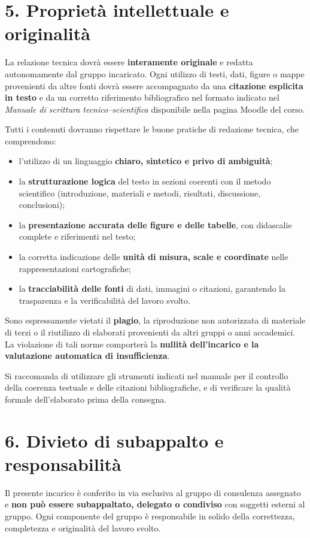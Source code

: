 \documentclass[11pt,a4paper,roman]{moderncv}
\begin{document}
\section*{5. Proprietà intellettuale e originalità}
La relazione tecnica dovrà essere \textbf{interamente originale} e redatta autonomamente dal gruppo incaricato.  
Ogni utilizzo di testi, dati, figure o mappe provenienti da altre fonti dovrà essere accompagnato da una \textbf{citazione esplicita in testo} e da un corretto riferimento bibliografico nel formato indicato nel \textit{Manuale di scrittura tecnico–scientifica} disponibile nella pagina Moodle del corso.

Tutti i contenuti dovranno rispettare le buone pratiche di redazione tecnica, che comprendono:
\begin{itemize}
  \item l’utilizzo di un linguaggio \textbf{chiaro, sintetico e privo di ambiguità};
  \item la \textbf{strutturazione logica} del testo in sezioni coerenti con il metodo scientifico (introduzione, materiali e metodi, risultati, discussione, conclusioni);
  \item la \textbf{presentazione accurata delle figure e delle tabelle}, con didascalie complete e riferimenti nel testo;
  \item la corretta indicazione delle \textbf{unità di misura, scale e coordinate} nelle rappresentazioni cartografiche;
  \item la \textbf{tracciabilità delle fonti} di dati, immagini o citazioni, garantendo la trasparenza e la verificabilità del lavoro svolto.
\end{itemize}

Sono espressamente vietati il \textbf{plagio}, la riproduzione non autorizzata di materiale di terzi o il riutilizzo di elaborati provenienti da altri gruppi o anni accademici.  
La violazione di tali norme comporterà la \textbf{nullità dell’incarico e la valutazione automatica di insufficienza}.

Si raccomanda di utilizzare gli strumenti indicati nel manuale per il controllo della coerenza testuale e delle citazioni bibliografiche, e di verificare la qualità formale dell’elaborato prima della consegna.

\section*{6. Divieto di subappalto e responsabilità}
Il presente incarico è conferito in via esclusiva al gruppo di consulenza assegnato e \textbf{non può essere subappaltato, delegato o condiviso} con soggetti esterni al gruppo.  
Ogni componente del gruppo è responsabile in solido della correttezza, completezza e originalità del lavoro svolto.
\end{document}
